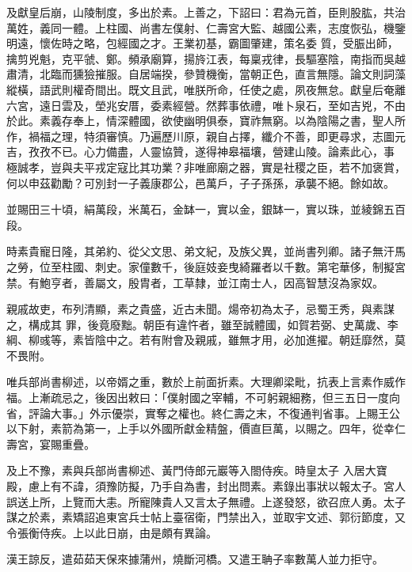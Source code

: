 \begin{pinyinscope}
 及獻皇后崩，山陵制度，多出於素。上善之，下詔曰：君為元首，臣則股肱，共治萬姓，義同一體。上柱國、尚書左僕射、仁壽宮大監、越國公素，志度恢弘，機鑒明遠，懷佐時之略，包經國之才。王業初基，霸圖肇建，策名委
 質，受脤出師，擒剪兇魁，克平虢、鄭。頻承廟算，揚旍江表，每稟戎律，長驅塞陰，南指而吳越肅清，北臨而獯獫摧服。自居端揆，參贊機衡，當朝正色，直言無隱。論文則詞藻縱橫，語武則權奇間出。既文且武，唯朕所命，任使之處，夙夜無怠。獻皇后奄離六宮，遠日雲及，塋兆安厝，委素經營。然葬事依禮，唯卜泉石，至如吉兇，不由於此。素義存奉上，情深體國，欲使幽明俱泰，寶祚無窮。以為陰陽之書，聖人所作，禍福之理，特須審慎。乃遍歷川原，親自占擇，纖介不善，即更尋求，志圖元吉，孜孜不已。心力備盡，人靈協贊，遂得神皋福壤，營建山陵。論素此心，事
 極誠孝，豈與夫平戎定寇比其功業？非唯廊廟之器，實是社稷之臣，若不加褒賞，何以申茲勸勵？可別封一子義康郡公，邑萬戶，子子孫孫，承襲不絕。餘如故。



 並賜田三十頃，絹萬段，米萬石，金缽一，實以金，銀缽一，實以珠，並綾錦五百段。



 時素貴寵日隆，其弟約、從父文思、弟文紀，及族父異，並尚書列卿。諸子無汗馬之勞，位至柱國、刺史。家僮數千，後庭妓妾曳綺羅者以千數。第宅華侈，制擬宮禁。有鮑亨者，善屬文，殷胄者，工草隸，並江南士人，因高智慧沒為家奴。



 親戚故吏，布列清顯，素之貴盛，近古未聞。煬帝初為太子，忌蜀王秀，與素謀之，構成其
 罪，後竟廢黜。朝臣有違忤者，雖至誠體國，如賀若弼、史萬歲、李綱、柳彧等，素皆陰中之。若有附會及親戚，雖無才用，必加進擢。朝廷靡然，莫不畏附。



 唯兵部尚書柳述，以帝婿之重，數於上前面折素。大理卿梁毗，抗表上言素作威作福。上漸疏忌之，後因出敕曰：「僕射國之宰輔，不可躬親細務，但三五日一度向省，評論大事。」外示優崇，實奪之權也。終仁壽之末，不復通判省事。上賜王公以下射，素箭為第一，上手以外國所獻金精盤，價直巨萬，以賜之。四年，從幸仁壽宮，宴賜重疊。



 及上不豫，素與兵部尚書柳述、黃門侍郎元巖等入閤侍疾。時皇太子
 入居大寶殿，慮上有不諱，須豫防擬，乃手自為書，封出問素。素錄出事狀以報太子。宮人誤送上所，上覽而大恚。所寵陳貴人又言太子無禮。上遂發怒，欲召庶人勇。太子謀之於素，素矯詔追東宮兵士帖上臺宿衛，門禁出入，並取宇文述、郭衍節度，又令張衡侍疾。上以此日崩，由是頗有異論。



 漢王諒反，遣茹茹天保來據蒲州，燒斷河橋。又遣王聃子率數萬人並力拒守。




\end{pinyinscope}
